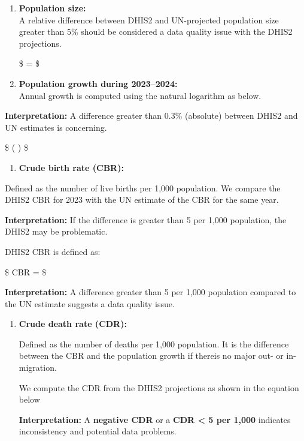 \documentclass[
  english,
  letterpaper,
  DIV=11,
  numbers=noendperiod]{scrreprt}
\providecommand{\tightlist}{%
  \setlength{\itemsep}{0pt}\setlength{\parskip}{0pt}}
\begin{document}
\begin{enumerate}
\def\labelenumi{\arabic{enumi}.}
\item
  \textbf{Population size:}\\
  A relative difference between DHIS2 and UN-projected population size
  greater than 5\% should be considered a data quality issue with the
  DHIS2 projections.

  \$  = \left\textbar{}
  \right\textbar{} \$
\item
  \textbf{Population growth during 2023--2024:}\\
  Annual growth is computed using the natural logarithm as below.
\end{enumerate}

\textbf{Interpretation:} A difference greater than 0.3\% (absolute)
between DHIS2 and UN estimates is concerning.

\$ \ln \left(  \right) \$

\begin{enumerate}
\def\labelenumi{\arabic{enumi}.}
\setcounter{enumi}{2}
\tightlist
\item
  \textbf{Crude birth rate (CBR):}
\end{enumerate}

Defined as the number of live births per 1,000 population. We compare
the DHIS2 CBR for 2023 with the UN estimate of the CBR for the same
year.

\textbf{Interpretation:} If the difference is greater than 5 per 1,000
population, the DHIS2 may be problematic.

DHIS2 CBR is defined as:

\$ CBR =
 \$

\textbf{Interpretation:} A difference greater than 5 per 1,000
population compared to the UN estimate suggests a data quality issue.

\begin{enumerate}
\def\labelenumi{\arabic{enumi}.}
\setcounter{enumi}{3}
\item
  \textbf{Crude death rate (CDR):}

  Defined as the number of deaths per 1,000 population. It is the
  difference between the CBR and the population growth if thereis no
  major out- or in-migration.

  We compute the CDR from the DHIS2 projections as shown in the equation
  below

  \textbf{Interpretation:} A \textbf{negative CDR} or a \textbf{CDR
  \textless{} 5 per 1,000} indicates inconsistency and potential data
  problems.
\end{enumerate}
\end{document}

